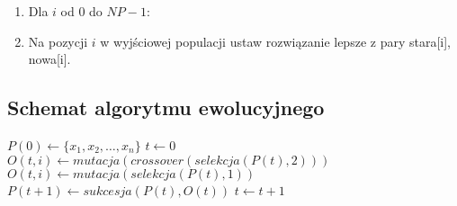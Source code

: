 \documentclass[12pt, a4paper]{article}
\begin{document}
\begin{enumerate}
 \item Dla $i$ od 0 do $NP-1$:
 \item Na pozycji $i$ w wyjściowej populacji ustaw rozwiązanie lepsze z pary stara[i], nowa[i].
\end{enumerate}

\subsection{Schemat algorytmu ewolucyjnego}

\begin{algorithm}[!htb]
\label{ea}
\begin{algorithmic}[1]

	\State $P(0) \gets \{x_1, x_2, \ldots, x_n\}$
	\State $t \gets 0$
    			\State $O(t,i) \gets mutacja(crossover(selekcja(P(t), 2)))$
    		\Else
    			\State $O(t,i) \gets mutacja(selekcja(P(t),1))$
    		\EndIf
    	\EndFor
    \State $P(t+1) \gets sukcesja(P(t),O(t))$
    \State $t \gets t+1$
  	\EndWhile
\EndFunction
\end{algorithmic}
\end{algorithm}

\nocite{*}


\end{document}
